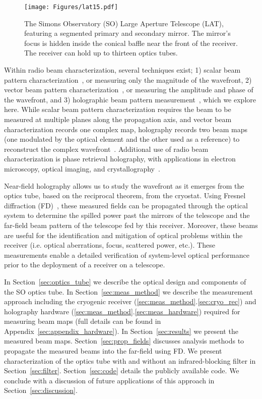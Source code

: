 \begin{figure}[ht]
    \centering
    \texttt{[image: Figures/lat15.pdf]}
    \caption{The Simons Observatory (SO) Large Aperture Telescope (LAT), featuring a segmented primary and secondary mirror.  The mirror's focus is hidden inside the conical baffle near the front of the receiver.  The receiver can hold up to thirteen optics tubes.}
    \label{fig:lat}
\end{figure}

Within radio beam characterization, several techniques exist; 1) scalar beam pattern characterization~\cite{doi:10.1063/1.3292308}, or measuring only the magnitude of the wavefront, 2) vector beam pattern characterization~\cite{2020JLTP..199..156Y,7740846}, or measuring the amplitude and phase of the wavefront, and 3) holographic beam pattern measurement~\cite{387181,7740846}, which we explore here.  While scalar beam pattern characterization requires the beam to be measured at multiple planes along the propagation axis, and vector beam characterization records one complex map, holography records two beam maps (one modulated by the optical element and the other used as a reference) to reconstruct the complex wavefront~\cite{4584681,alma_holog}.  Additional use of radio beam characterization is phase retrieval holography, with applications in electron microscopy, optical imaging, and crystallography~\cite{7078985}.

Near-field holography allows us to study the wavefront as it emerges from the optics tube, based on the reciprocal theorem, from the cryostat.  Using Fresnel diffraction (FD)~\cite{Goodman2005-ne}, these measured fields can be propagated through the optical system to determine the spilled power past the mirrors of the telescope and the far-field beam pattern of the telescope fed by this receiver.  Moreover, these beams are useful for the identification and mitigation of optical problems within the receiver (i.e. optical aberrations, focus, scattered power, etc.).  These measurements enable a detailed verification of system-level optical performance prior to the deployment of a receiver on a telescope.

In Section~\ref{sec:optics_tube} we describe the optical design and components of the SO optics tube.  In Section~\ref{sec:meas_method} we describe the measurement approach including the cryogenic receiver (\ref{sec:meas_method}.\ref{sec:cryo_rec}) and holography hardware (\ref{sec:meas_method}.\ref{sec:meas_hardware}) required for measuring beam maps (full details can be found in Appendix~\ref{sec:appendix_hardware}).  In Section~\ref{sec:results} we present the measured beam maps.   Section~\ref{sec:prop_fields} discusses analysis methods to propagate the measured beams into the far-field using FD.  We present characterization of the optics tube with and without an infrared-blocking filter in Section~\ref{sec:filter}.  Section~\ref{sec:code} details the publicly available code.  We conclude with a discussion of future applications of this approach in Section~\ref{sec:discussion}.  

